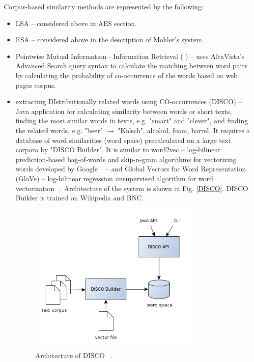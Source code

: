 \documentclass[11pt]{report}
\numberwithin{equation}{section} %
\begin{document}
Corpus-based similarity methods are represented by the following:

\begin{itemize}
\item LSA -- considered above in AES section.
\item ESA -- considered above in the description of Mohler's system.
\item Pointwise Mutual Information - Information Retrieval ( ) -- uses  AltaVista's Advanced Search query syntax to calculate the matching between word pairs by calculating the probability of co-occurrence of the words based on web pages corpus.
\item extracting DIstributionally related words using CO-occurrences (DISCO) -- Java application for calculating similarity between words or short texts, finding the most similar words in texts, e.g. "smart" and "clever", and finding the related words, e.g. "beer" $\rightarrow$ "K\"olsch", alcohol, foam, barrel. It requires a database of word similarities (word space) precalculated on a large text corpora by "DISCO Builder". It is similar to word2vec --  log-bilinear prediction-based bag-of-words and skip-n-gram algorithms for vectorizing words developed by Google  ~\cite{word2vec} -- and Global Vectors for Word Representation (GloVe) -- log-bilinear regression unsupervised algorithm for word vectorization ~\cite{GloVe}. Architecture of the system is shown in Fig. \ref{DISCO}. DISCO Builder is trained on Wikipedia and BNC. 
\begin{figure}[h!]
  \centering
  \includegraphics[width=0.8\textwidth]{img/DISCO}
    \caption{ Architecture of DISCO ~\cite{DISCO}. }\label{fig:DISCO}
\end{figure}
\end{itemize}
\end{document}
